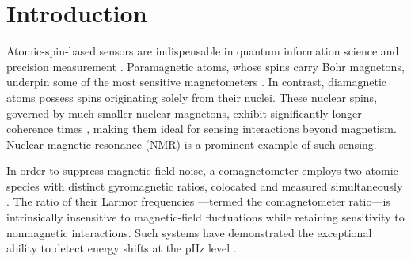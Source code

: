 \documentclass[pdflatex,sn-nature,centre]{sn-jnl}%
\begin{document}




\maketitle

\section*{Introduction}

Atomic-spin-based sensors are indispensable in quantum information science \cite{Luca2018QMetrologyRev} and precision measurement \cite{Budker2007Mag, Lei2025SpinExoticRMP}. Paramagnetic atoms, whose spins carry Bohr magnetons, underpin some of the most sensitive magnetometers \cite{Kominis2003SERF}. In contrast, diamagnetic atoms possess spins originating solely from their nuclei. These nuclear spins, governed by much smaller nuclear magnetons, exhibit significantly longer coherence times \cite{Zheng2022YbEDM}, making them ideal for sensing interactions beyond magnetism. Nuclear magnetic resonance (NMR) is a prominent example of such sensing.

In order to suppress magnetic-field noise, a comagnetometer employs two atomic species with distinct gyromagnetic ratios, colocated and measured simultaneously \cite{Terrano2022ComagNewPhys}. The ratio of their Larmor frequencies —termed the comagnetometer ratio—is intrinsically insensitive to magnetic-field fluctuations while retaining sensitivity to nonmagnetic interactions. Such systems have demonstrated the exceptional ability to detect energy shifts at the pHz level \cite{Vasilakis2009ComagSpinDependent}.
\end{document}

